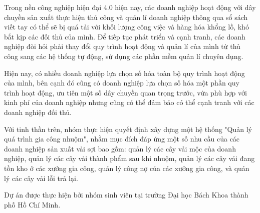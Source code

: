 Trong nền công nghiệp hiện đại 4.0 hiện nay, các doanh nghiệp hoạt động với dây chuyền sản xuất thực hiện thủ công và quản lí doanh nghiệp thông qua sổ sách viết tay có thể sẽ bị quá tải với khối lượng công việc và hàng hóa khổng lồ, khó bắt kịp các đối thủ của mình. Để tiếp tục phát triển và cạnh tranh, các doanh nghiệp đòi hỏi phải thay đổi quy trình hoạt động và quản lí của mình từ thủ công sang các hệ thống tự động, sử dụng các phần mềm quản lí chuyên dụng. \par

Hiện nay, có nhiều doanh nghiệp lựa chọn số hóa toàn bộ quy trình hoạt động của mình, bên cạnh đó cũng có doanh nghiệp lựa chọn số hóa một phần quy trình hoạt động, ưu tiên một số dây chuyền quan trọng trước, vừa phù hợp với kinh phí của doanh nghiệp nhưng cũng có thể đảm bảo có thể cạnh tranh với các doanh nghiệp đối thủ. \par

Với tinh thần trên, nhóm thực hiện quyết định xây dựng một hệ thống "Quản lý quá trình gia công nhuộm", nhằm mục đích đáp ứng một số nhu cầu của các doanh nghiệp sản xuất vải sợi bao gồm: quản lý các cây vải mộc của doanh nghiệp, quản lý các cây vải thành phẩm sau khi nhuộm, quản lý các cây vải đang tồn kho ở các xưởng gia công, quản lý công nợ của các xưởng gia công, và quản lý các cây vải lỗi trả lại. \par

Dự án được thực hiện bởi nhóm sinh viên tại trường Đại học Bách Khoa thành phố Hồ Chí Minh.  \par